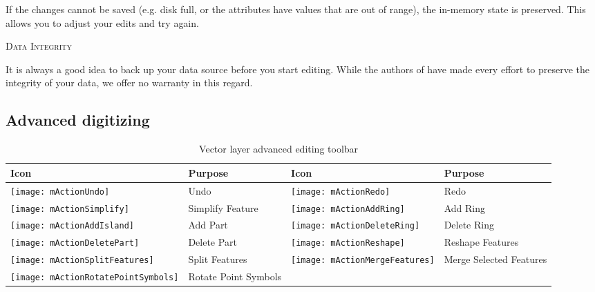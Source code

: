 If the changes cannot be saved (e.g. disk full, or the attributes have
values that are out of range), the \qg in-memory state is preserved.  This
allows you to adjust your edits and try again.

\begin{Tip}\caption{\textsc{Data Integrity}}
It is always a good idea to back up your data source before you
start
editing. While the authors of \qg have made every effort to preserve the
integrity of your data, we offer no warranty in this regard.
\end{Tip}

\subsection{Advanced digitizing}
\label{sec:advanced_edit}

\begin{table}[h]
\centering
\small
\begin{tabular}{|l|p{6.9cm}|l|p{6.9cm}|}
\hline \textbf{Icon} & \textbf{Purpose} & \textbf{Icon} & \textbf{Purpose} \\
\hline \texttt{[image: mActionUndo]}
   & Undo 
   & \texttt{[image: mActionRedo]}
   & Redo \\
\hline \texttt{[image: mActionSimplify]}
   & Simplify Feature
   & \texttt{[image: mActionAddRing]}
   & Add Ring \\
\hline \texttt{[image: mActionAddIsland]}
   & Add Part
   & \texttt{[image: mActionDeleteRing]}
   & Delete Ring \\
\hline \texttt{[image: mActionDeletePart]}
   & Delete Part
   & \texttt{[image: mActionReshape]}
   & Reshape Features \\
\hline \texttt{[image: mActionSplitFeatures]}
   & Split Features
   & \texttt{[image: mActionMergeFeatures]}
   & Merge Selected Features \\
\hline \texttt{[image: mActionRotatePointSymbols]}
   & Rotate Point Symbols
   &
   & \\
\hline
\end{tabular}
\caption{Vector layer advanced editing toolbar}\label{tab:advanced_editing}
\end{table}


